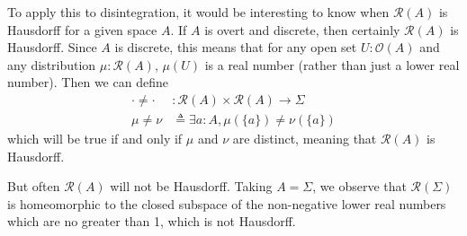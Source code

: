 To apply this to disintegration, it would be interesting to know when 
$\mathcal{R}(A)$ is Hausdorff for a given space $A$. If $A$ is overt
and discrete, then certainly $\mathcal{R}(A)$ is Hausdorff. Since $A$
is discrete, this means that for any open set $U : \mathcal{O}(A)$
and any distribution $\mu : \mathcal{R}(A)$, $\mu(U)$ is a real number
(rather than just a lower real number).
Then we can define
\begin{align*}
\cdot \neq \cdot &: \mathcal{R}(A) \times \mathcal{R}(A) \to \Sigma
\\ \mu \neq \nu &\triangleq \exists a : A, \mu(\{ a \}) \neq \nu(\{a \})
\end{align*}
which will be true if and only if $\mu$ and $\nu$ are distinct,
meaning that $\mathcal{R}(A)$ is Hausdorff.

But often $\mathcal{R}(A)$ will not be Hausdorff. Taking $A = \Sigma$,
we observe that $\mathcal{R}(\Sigma)$ is homeomorphic to the closed
subspace of the non-negative lower real numbers which are no greater
than 1, which is not Hausdorff.